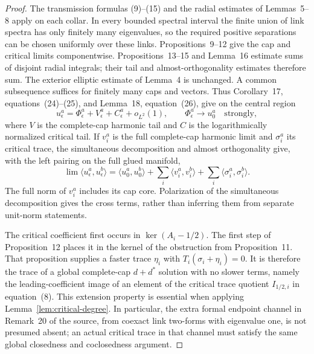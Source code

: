 \begin{proof}
The transmission formulas (9)--(15) and the radial estimates of
Lemmas~5--8 apply on each collar. In every bounded spectral interval the
finite union of link spectra has only finitely many eigenvalues, so the
required positive separations can be chosen uniformly over these links.
Propositions~9--12 give the cap and critical limits componentwise.
Propositions~13--15 and Lemma~16 estimate sums of disjoint radial integrals;
their tail and almost-orthogonality estimates therefore sum. The exterior
elliptic estimate of Lemma~4 is unchanged. A common subsequence suffices
for finitely many caps and vectors. Thus Corollary~17, equations~(24)--(25),
and Lemma~18, equation~(26), give on the central region
\begin{equation}\label{eq:multicap-decomposition}
 u_\epsilon^a=\Phi_\epsilon^a+V_\epsilon^a+C_\epsilon^a+o_{L^2}(1),
 \qquad \Phi_\epsilon^a\longrightarrow u_0^a\quad\text{strongly},
\end{equation}
where $V$ is the complete-cap harmonic tail and $C$ is the logarithmically
normalized critical tail. If $v_i^a$ is the full complete-cap harmonic
limit and $\sigma_i^a$ its critical trace, the simultaneous decomposition
and almost orthogonality give, with the left pairing on the full glued manifold,
\begin{equation}\label{eq:multicap-gram}
 \lim\langle u_\epsilon^a,u_\epsilon^b\rangle
 =\langle u_0^a,u_0^b\rangle+
   \sum_i\langle v_i^a,v_i^b\rangle+
   \sum_i\langle\sigma_i^a,\sigma_i^b\rangle.
\end{equation}
The full norm of $v_i^a$ includes its cap core. Polarization of the
simultaneous decomposition gives the cross terms, rather than inferring
them from separate unit-norm statements.

The critical coefficient first occurs in $\ker(A_i-1/2)$. The first
step of Proposition~12 places it in the kernel of the obstruction from
Proposition~11. That proposition supplies a faster trace $\eta_i$ with
$T_i(\sigma_i+\eta_i)=0$. It is therefore the trace of a global
complete-cap $d+d^*$ solution with no slower terms, namely the leading-coefficient image of an element of the critical trace
quotient $I_{1/2,i}$ in equation~(8). This extension property is
essential when applying Lemma~\ref{lem:critical-degree}. In particular,
the extra formal endpoint channel in Remark~20 of the source, from
coexact link two-forms with eigenvalue one, is not presumed absent; an
actual critical trace in that channel must satisfy the same global
closedness and coclosedness argument.


\end{proof}
